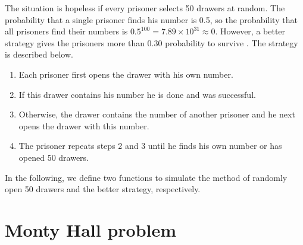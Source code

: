 The situation is hopeless if every prisoner selects 50 drawers at
random. The probability that a single prisoner finds his number is
0.5, so the probability that all prisoners find their numbers is
$0.5^{100} = 7.89\times10^{31}\approx0$. However, a better strategy
gives the prisoners more than 0.30 probability to survive
\citep{stanley2013algebraic}. The strategy is described below.

\begin{enumerate}
\item Each prisoner first opens the drawer with his own number.
\item If this drawer contains his number he is done and was
  successful.
\item Otherwise, the drawer contains the number of another prisoner
  and he next opens the drawer with this number.
\item The prisoner repeats steps 2 and 3 until he finds his own number
  or has opened 50 drawers.
\end{enumerate}

In the following, we define two functions to simulate the method of randomly open 50 drawers and the better strategy, respectively. 



\hypertarget{Monty-Hall-problem}{%
\section{Monty Hall problem}\label{Monty-Hall-problem}}


